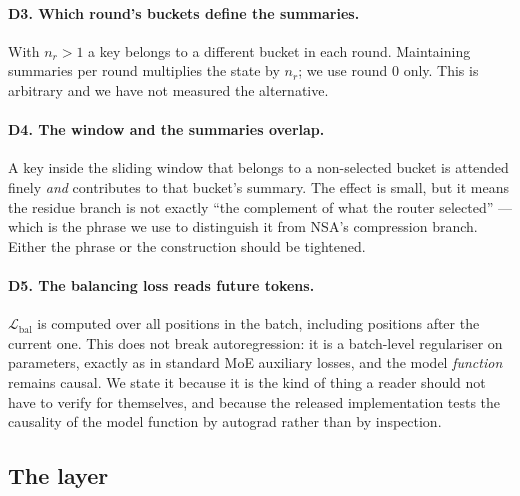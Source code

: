 \paragraph{D3. Which round's buckets define the summaries.} With $n_r > 1$ a key belongs to a different bucket in each round. Maintaining summaries per round multiplies the state by $n_r$; we use round $0$ only. This is arbitrary and we have not measured the alternative.

\paragraph{D4. The window and the summaries overlap.} A key inside the sliding window that belongs to a non-selected bucket is attended finely \emph{and} contributes to that bucket's summary. The effect is small, but it means the residue branch is not exactly ``the complement of what the router selected'' --- which is the phrase we use to distinguish it from NSA's compression branch. Either the phrase or the construction should be tightened.

\paragraph{D5. The balancing loss reads future tokens.} $\mathcal{L}_{\text{bal}}$ is computed over all positions in the batch, including positions after the current one. This does not break autoregression: it is a batch-level regulariser on parameters, exactly as in standard MoE auxiliary losses, and the model \emph{function} remains causal. We state it because it is the kind of thing a reader should not have to verify for themselves, and because the released implementation tests the causality of the model function by autograd rather than by inspection.

\subsection{The layer}

